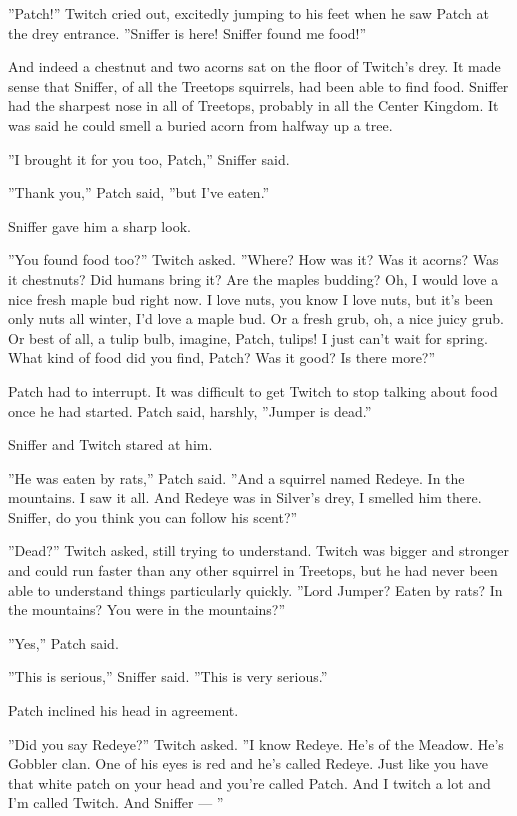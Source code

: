 \documentclass[12pt]{book}
\begin{document}
''Patch!'' Twitch cried out, excitedly jumping to his feet when he saw Patch at the drey entrance. ''Sniffer is here! Sniffer found me food!''

And indeed a chestnut and two acorns sat on the floor of Twitch's drey. It made sense that Sniffer, of all the Treetops squirrels, had been able to find food. Sniffer had the sharpest nose in all of Treetops, probably in all the Center Kingdom. It was said he could smell a buried acorn from halfway up a tree.

''I brought it for you too, Patch,'' Sniffer said.

''Thank you,'' Patch said, ''but I've eaten.''

Sniffer gave him a sharp look.

''You found food too?'' Twitch asked. ''Where? How was it? Was it acorns? Was it chestnuts? Did humans bring it? Are the maples budding? Oh, I would love a nice fresh maple bud right now. I love nuts, you know I love nuts, but it's been only nuts all winter, I'd love a maple bud. Or a fresh grub, oh, a nice juicy grub. Or best of all, a tulip bulb, imagine, Patch, tulips! I just can't wait for spring. What kind of food did you find, Patch? Was it good? Is there more?''

Patch had to interrupt. It was difficult to get Twitch to stop talking about food once he had started. Patch said, harshly, ''Jumper is dead.''

Sniffer and Twitch stared at him.

''He was eaten by rats,'' Patch said. ''And a squirrel named Redeye. In the mountains. I saw it all. And Redeye was in Silver's drey, I smelled him there. Sniffer, do you think you can follow his scent?''

''Dead?'' Twitch asked, still trying to understand. Twitch was bigger and stronger and could run faster than any other squirrel in Treetops, but he had never been able to understand things particularly quickly. ''Lord Jumper? Eaten by rats? In the mountains? You were in the mountains?''

''Yes,'' Patch said.

''This is serious,'' Sniffer said. ''This is very serious.''

Patch inclined his head in agreement.

''Did you say Redeye?'' Twitch asked. ''I know Redeye. He's of the Meadow. He's Gobbler clan. One of his eyes is red and he's called Redeye. Just like you have that white patch on your head and you're called Patch. And I twitch a lot and I'm called Twitch. And Sniffer ---
''
\end{document}
